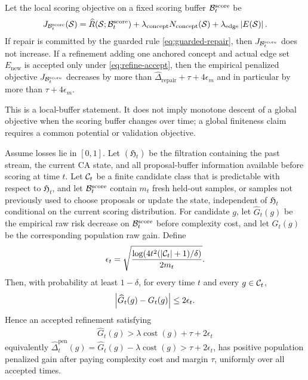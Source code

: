 \begin{theorem}
\label{thm:refine-repair-descent:informal}
Let the local scoring objective on a fixed scoring buffer $\mathcal{B}_t^{\mathrm{score}}$ be
\begin{align*}
J_{\mathcal{B}_t^{\mathrm{score}}}(\mathcal{S})
=
\widehat R(\mathcal{S};\mathcal{B}_t^{\mathrm{score}})
+\lambda_{\mathrm{concept}}N_{\mathrm{concept}}(\mathcal{S})
+\lambda_{\mathrm{edge}}\left\lvert E(\mathcal{S})\right\rvert.
\end{align*}
If repair is committed by the guarded rule \eqref{eq:guarded-repair}, then $J_{\mathcal{B}_t^{\mathrm{score}}}$ does not increase. If a refinement adding one anchored concept and actual edge set $E_{\mathrm{new}}$ is accepted only under \eqref{eq:refine-accept}, then the empirical penalized objective $J_{\mathcal{B}_t^{\mathrm{score}}}$ decreases by more than $\widehat\Delta_{\mathrm{repair}}+\tau+4\epsilon_m$ and in particular by more than $\tau+4\epsilon_m$.
\end{theorem}

This is a local-buffer statement. It does not imply monotone descent of a global objective when the scoring buffer changes over time; a global finiteness claim requires a common potential or validation objective.

\begin{theorem}
\label{thm:safe-refinement:informal}
Assume losses lie in $[0,1]$. Let $(\mathfrak H_t)$ be the filtration containing the past stream, the current CA state, and all proposal-buffer information available before scoring at time $t$. Let $\mathcal{C}_t$ be a finite candidate class that is predictable with respect to $\mathfrak H_t$, and let $\mathcal{B}_t^{\mathrm{score}}$ contain $m_t$ fresh held-out samples, or samples not previously used to choose proposals or update the state, independent of $\mathfrak H_t$ conditional on the current scoring distribution. For candidate $g$, let $\widehat G_t(g)$ be the empirical raw risk decrease on $\mathcal{B}_t^{\mathrm{score}}$ before complexity cost, and let $G_t(g)$ be the corresponding population raw gain. Define
\begin{align*}
\epsilon_t=
\sqrt{
\frac{\log(4t^2(\left\lvert\mathcal{C}_t\right\rvert+1)/\delta)}
{2m_t}
}.
\end{align*}
Then, with probability at least $1-\delta$, for every time $t$ and every $g\in\mathcal{C}_t$,
\begin{align*}
\left\lvert\widehat G_t(g)-G_t(g)\right\rvert
\le
2\epsilon_t.
\end{align*}
Hence an accepted refinement satisfying
\begin{align*}
\widehat G_t(g)>
\lambda\operatorname{cost}(g)+\tau+2\epsilon_t
\end{align*}
equivalently $\widehat\Delta_t^{\mathrm{pen}}(g)=\widehat G_t(g)-\lambda\operatorname{cost}(g)>\tau+2\epsilon_t$, has positive population penalized gain after paying complexity cost and margin $\tau$, uniformly over all accepted times.
\end{theorem}

